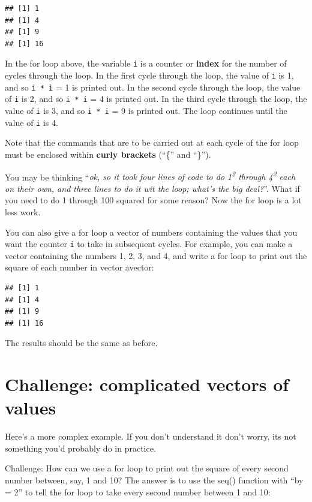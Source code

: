 \documentclass[
]{book}
\begin{document}
\begin{verbatim}
## [1] 1
## [1] 4
## [1] 9
## [1] 16
\end{verbatim}

In the for loop above, the variable \texttt{i} is a counter or \textbf{index} for the number of cycles through the loop. In the first cycle through the loop, the value of \texttt{i} is 1, and so \texttt{i\ *\ i} = 1 is printed out. In the second cycle through the loop, the value of \texttt{i} is 2, and so \texttt{i\ *\ i} = 4 is printed out. In the third cycle through the loop, the value of \texttt{i} is 3, and so \texttt{i\ *\ i} = 9 is printed out. The loop continues until the value of \texttt{i} is 4.

Note that the commands that are to be carried out at each cycle of the for loop must be enclosed within \textbf{curly brackets} (``\{'' and ``\}'').

You may be thinking ``\emph{ok, so it took four lines of code to do 1\textsuperscript{2} through 4\textsuperscript{2} each on their own, and three lines to do it wit the loop; what's the big deal?}''. What if you need to do 1 through 100 squared for some reason? Now the for loop is a lot less work.

You can also give a for loop a vector of numbers containing the values that you want the counter \texttt{i} to take in subsequent cycles. For example, you can make a vector containing the numbers 1, 2, 3, and 4, and write a for loop to print out the square of each number in vector avector:

\begin{verbatim}
## [1] 1
## [1] 4
## [1] 9
## [1] 16
\end{verbatim}

The results should be the same as before.

\hypertarget{challenge-complicated-vectors-of-values}{%
\section{Challenge: complicated vectors of values}\label{challenge-complicated-vectors-of-values}}

Here's a more complex example. If you don't understand it don't worry, its not something you'd probably do in practice.

Challenge: How can we use a for loop to print out the square of every second number between, say, 1 and 10? The answer is to use the seq() function with ``by = 2'' to tell the for loop to take every second number between 1 and 10:
\end{document}
